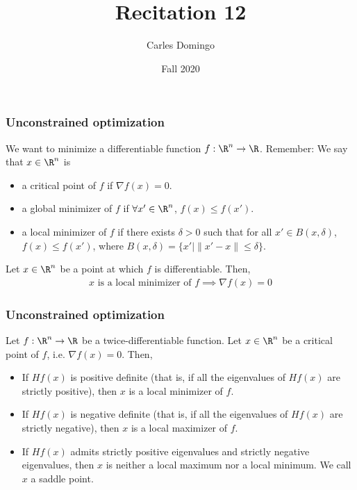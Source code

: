 \documentclass{beamer}
\title{Recitation 12}
\author{Carles Domingo}
\date{Fall 2020}
\begin{document}
\frame{\titlepage} 

\setcounter{showProgressBar}{0}
\setcounter{showSlideNumbers}{1}

\begin{frame}[t]
\frametitle{Unconstrained optimization}

We want to minimize a differentiable function $f : \R^n \rightarrow \R$. 
Remember: We say that $x \in \R^n$ is
\begin{itemize}
\item a critical point of $f$ if $\nabla f(x) = 0$.
\item a global minimizer of $f$ if $\forall x' \in \R^n$, $f(x) \leq f(x')$.
\item a local minimizer of $f$ if there exists $\delta > 0$ such that for all $x'  \in B(x,\delta)$, $f(x) \leq  f(x')$, where $B(x, \delta) = \{x' | \|x'-x\| \leq \delta \}$.
\end{itemize}

\begin{theorem} 
Let $x \in \R^n$ be a point at which $f$ is differentiable. Then,
\begin{align*}
x \text{ is a local minimizer of } f \implies \nabla f (x) = 0
\end{align*}
\end{theorem}
\end{frame}

\begin{frame}[t]
\frametitle{Unconstrained optimization}
\begin{theorem} 
Let $f : \R^n \rightarrow \R$ be a twice-differentiable function. Let $x \in \R^n$ be a critical point of $f$, i.e. $\nabla f(x) = 0$. Then, 
\begin{itemize}
\item If $Hf (x)$ is positive definite (that is, if all the eigenvalues of $Hf (x)$ are strictly positive), then $x$ is a local minimizer of $f$.
\item If $Hf(x)$ is negative definite (that is, if all the eigenvalues of $Hf(x)$ are strictly negative), then $x$ is a local maximizer of $f$.
\item If $Hf(x)$ admits strictly positive eigenvalues and strictly negative eigenvalues, then $x$ is neither a local maximum nor a local minimum. We call $x$ a saddle point.
\end{itemize}
\end{theorem}
\end{frame}
\end{document}
